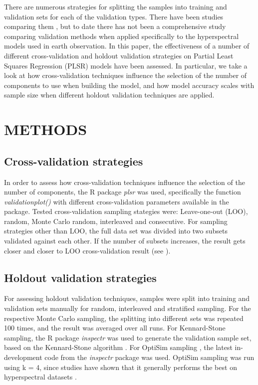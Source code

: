 \documentclass{isprs}
\begin{document}
There are numerous strategies for splitting the samples into training and validation sets for each of the validation types. There have been studies comparing them \cite{clark2003boosted}, but to date there has not been a comprehensive study comparing validation methods when applied specifically to the hyperspectral models used in earth observation. In this paper, the effectiveness of a number of different cross-validation and holdout validation strategies on Partial Least Squares Regression (PLSR) models have been assessed. In particular, we take a look at how cross-validation techniques influence the selection of the number of components to use when building the model, and how model accuracy scales with sample size when different holdout validation techniques are applied.

\section{METHODS}\label{sec:METHODS}

\subsection{Cross-validation strategies}\label{sec:Cross-validation strategies}

In order to assess how cross-validation techniques influence the selection of the number of components, the R package \textit{plsr} was used, specifically the function \textit{validationplot()} with different cross-validation parameters available in the package. Tested cross-validation sampling stategies were: Leave-one-out (LOO), random, Monte Carlo random, interleaved and consecutive. For sampling strategies other than LOO, the full data set was divided into two subsets validated against each other. If the number of subsets increases, the result gets closer and closer to LOO cross-validation result (see ).

\subsection{Holdout validation strategies}\label{sec:Holdout validation strategies}

For assessing holdout validation techniques, samples were split into training and validation sets manually for random, interleaved and stratified sampling. For the respective Monte Carlo sampling, the splitting into different sets was repeated 100 times, and the result was averaged over all runs. For Kennard-Stone sampling, the R package \textit{inspectr} was used to generate the validation sample set, based on the Kennard-Stone algorithm \cite{kennard1969computer}. For OptiSim sampling \cite{clark1997optisim}, the latest in-development code from the \textit{inspectr} package was used. OptiSim sampling was run using k = 4, since studies have shown that it generally performs the best on hyperspectral datasets \cite{clark2003boosted}.
\end{document}
